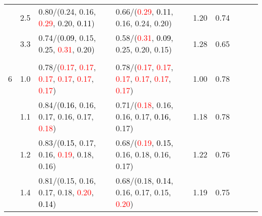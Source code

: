 \documentclass[10pt,a4paper]{report}
\begin{document}
\begin{table}[!htbp]
\begin{center}
{\begin{tabular}{ccllccccc}
				  & 2.5                               & 0.80/(0.24, 0.16, \textcolor{red}{0.29}, 0.20, \textcolor{black}{0.11})                                                                         & 0.66/(\textcolor{red}{0.29}, \textcolor{black}{0.11}, 0.16, 0.24, 0.20)                                                                         & 1.20             & 0.74                     \\
				  & 3.3                               & 0.74/(\textcolor{black}{0.09}, 0.15, 0.25, \textcolor{red}{0.31}, 0.20)                                                                         & 0.58/(\textcolor{red}{0.31}, \textcolor{black}{0.09}, 0.25, 0.20, 0.15)                                                                         & 1.28             & 0.65                     \\
				  &                                   &                                                                                                                                                 &                                                                                                                                                 &                                             \\
				6 & 1.0                               & 0.78/(\textcolor{red}{0.17}, \textcolor{red}{0.17}, \textcolor{red}{0.17}, \textcolor{red}{0.17}, \textcolor{red}{0.17}, \textcolor{red}{0.17}) & 0.78/(\textcolor{red}{0.17}, \textcolor{red}{0.17}, \textcolor{red}{0.17}, \textcolor{red}{0.17}, \textcolor{red}{0.17}, \textcolor{red}{0.17}) & 1.00             & 0.78                     \\
				  & 1.1                               & 0.84/(\textcolor{black}{0.16}, 0.16, 0.17, 0.16, 0.17, \textcolor{red}{0.18})                                                                   & 0.71/(\textcolor{red}{0.18}, 0.16, 0.16, 0.17, \textcolor{black}{0.16}, 0.17)                                                                   & 1.18             & 0.78                     \\
				  & 1.2                               & 0.83/(\textcolor{black}{0.15}, 0.17, 0.16, \textcolor{red}{0.19}, 0.18, 0.16)                                                                   & 0.68/(\textcolor{red}{0.19}, \textcolor{black}{0.15}, 0.16, 0.18, 0.16, 0.17)                                                                   & 1.22             & 0.76                     \\
				  & 1.4                               & 0.81/(0.15, 0.16, 0.17, 0.18, \textcolor{red}{0.20}, \textcolor{black}{0.14})                                                                   & 0.68/(0.18, \textcolor{black}{0.14}, 0.16, 0.17, 0.15, \textcolor{red}{0.20})                                                                   & 1.19             & 0.75                     \\

\end{tabular}}
\end{center}
\end{table}
\end{document}
